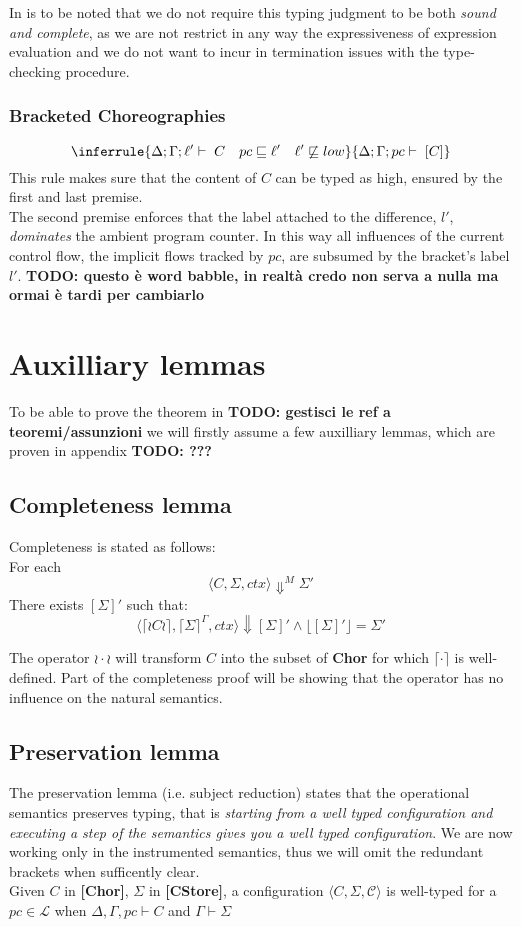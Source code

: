 \documentclass[12pt,a4paper,twoside]{book}
\newcommand{\MCL}{\mathscr{L}}
\begin{document}
In is to be noted that we do not require this typing judgment to be both \emph{sound and complete}, as we are not restrict in any way the expressiveness of expression evaluation and we do not want to incur in termination issues with the type-checking procedure.

\subsubsection{Bracketed Choreographies}
\[
  \inferrule
  {\Delta;\Gamma;\ell' \vdash \; C  \quad pc \sqsubseteq \ell' \quad \ell' \not\sqsubseteq low}
  {\Delta;\Gamma;pc \vdash \; [C]}
\]
This rule makes sure that the content of $C$ can be typed as high, ensured by the first and last premise.\\
The second premise enforces that the label attached to the difference, \(l'\), \emph{dominates} the ambient program counter. In this way all influences of the current control flow, the implicit flows tracked by \(pc\), are subsumed by the bracket’s label \(l'\). \textbf{TODO: questo è word babble, in realtà credo non serva a nulla ma ormai è tardi per cambiarlo}

\section{Auxilliary lemmas}
To be able to prove the theorem in \textbf{TODO: gestisci le ref a teoremi/assunzioni} we will firstly assume a few auxilliary lemmas, which are proven in appendix \textbf{TODO: ???}
\subsection{Completeness lemma}
Completeness is stated as follows:\\
For each
$$
\langle C, \Sigma, ctx \rangle \Downarrow^M \Sigma'
$$
There exists $[\Sigma]'$ such that:
$$
\langle \lceil \wr C \wr \rceil, \lceil \Sigma \rceil^\Gamma, ctx \rangle \Downarrow [\Sigma]'
\land \lfloor [\Sigma]' \rfloor = \Sigma'
$$

The operator $\wr \cdot \wr$ will transform $C$ into the subset of \textbf{Chor} for which
$\lceil \cdot \rceil$ is well-defined. Part of the completeness proof will be showing that the operator has no influence on the natural semantics.

\subsection{Preservation lemma}
The preservation lemma (i.e. subject reduction) states that the operational semantics preserves typing, that is \emph{starting from a well typed configuration and executing a step of the semantics gives you a well typed configuration}.
We are now working only in the instrumented semantics, thus we will omit the redundant brackets when sufficently clear.\\
Given $C$ in \textbf{[Chor]}, $\Sigma$ in \textbf{[CStore]}, a configuration
$\langle C, \Sigma, \mathscr{C}\rangle$ is well-typed for a $pc \in \MCL$ when
$\Delta, \Gamma, pc \vdash C$ and $\Gamma \vdash \Sigma$
\end{document}
